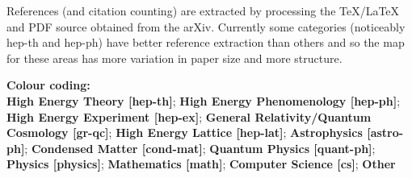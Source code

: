\documentclass[11pt]{article}
\begin{document}
References (and citation counting) are extracted by processing the TeX/LaTeX and PDF source obtained from the arXiv. 
Currently some categories (noticeably hep-th and hep-ph) have better reference extraction than others and so the map for these areas has more variation in paper size and more structure. 

{\bf Colour coding:}\\
{\bf\color[RGB]{0,0,255} High Energy Theory [hep-th]};
{\bf\color[RGB]{0,255,0} High Energy Phenomenology [hep-ph]}; 
{\bf\color[RGB]{255,255,0} High Energy Experiment [hep-ex]};
{\bf\color[RGB]{0,255,255} General Relativity/Quantum Cosmology [gr-qc]};
{\bf\color[RGB]{179,92,51} High Energy Lattice [hep-lat]};
{\bf\color[RGB]{227,135,153} Astrophysics [astro-ph]};
{\bf\color[RGB]{179,128,102} Condensed Matter [cond-mat]};
{\bf\color[RGB]{102,179,179} Quantum Physics [quant-ph]};
{\bf\color[RGB]{255,0,0} Physics [physics]};
{\bf\color[RGB]{158,219,61} Mathematics [math]};
{\bf\color[RGB]{179,77,153} Computer Science [cs]};
{\bf\color[RGB]{179,26,88} Other}
\end{document}
